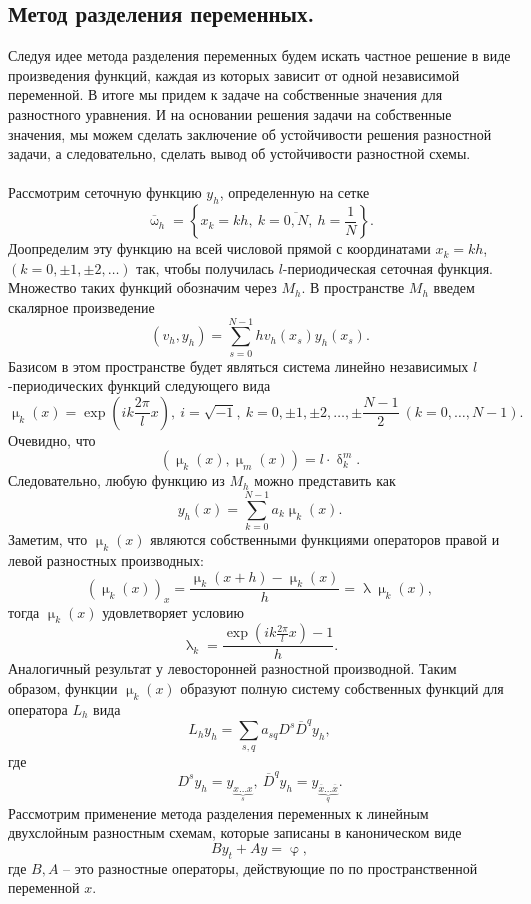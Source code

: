\documentclass[a4paper, 12pt]{report}
\numberwithin{equation}{section}
\newcommand{\ol}{\overline}
\renewcommand{\delta}{\updelta}
\renewcommand{\varphi}{\upvarphi}
\renewcommand{\lambda}{\uplambda}
\renewcommand{\mu}{\upmu}
\renewcommand{\omega}{\upomega}
\begin{document}
		 \subsection{Метод разделения переменных.}
		 Следуя идее метода разделения переменных будем искать частное решение в виде произведения функций, каждая из которых зависит от одной независимой переменной. В итоге мы придем к задаче на собственные значения для разностного уравнения. И на основании решения задачи на собственные значения, мы можем сделать заключение об устойчивости решения разностной задачи, а следовательно, сделать вывод об устойчивости разностной схемы.\\\\
		 Рассмотрим сеточную функцию $y_h$, определенную на сетке $$\ol \omega _h = \left\{x_k = kh,\ k = \ol{0,N},\ h = \dfrac 1N\right\}.$$
		 Доопределим эту функцию на всей числовой прямой с координатами $x_k = kh$, $(k = 0, \pm 1, \pm 2,\ldots)$ так, чтобы получилась $l$-периодическая сеточная функция. Множество таких функций обозначим через $M_h$. В пространстве $M_h$ введем скалярное произведение
		 $$(v_h, y_h) = \sum_{s=0}^{N-1} h v_h(x_s) y_h(x_s).$$
		 Базисом в этом пространстве будет являться система линейно независимых $l$-периодических функций следующего вида
		 $$\mu_k(x)=\exp\left(ik \frac {2\pi}lx\right),\ i = \sqrt{-1},\ k=0,\pm1,\pm2,\ldots,\pm \dfrac {N-1}{2}\ (k=0,\ldots,N-1).$$
		 Очевидно, что $$(\mu_k(x), \mu_m(x)) = l\cdot \delta ^m_k.$$
		 Следовательно, любую функцию из $M_h$ можно представить как
		 $$y_h(x) = \sum_{k=0}^{N-1} a_k \mu_k(x).$$
		 Заметим, что $\mu_k(x)$ являются собственными функциями операторов правой и левой разностных производных:
		 $$(\mu_k(x))_x = \dfrac{\mu_k(x+h) - \mu_k(x)}{h} = \lambda \mu_k(x),$$
		 тогда $\mu_k(x)$ удовлетворяет условию
		 $$\lambda_k = \dfrac{\exp\left(ik \frac {2\pi}lx\right) - 1}{h}.$$
		 Аналогичный результат у левосторонней разностной производной. Таким образом, функции $\mu_k(x)$ образуют полную систему собственных функций для оператора
		 $L_h$ вида $$L_h y_h = \sum_{s,q} a_{sq}D^s \ol D^q y_h,$$
		 где
		 $$D^s y_h = y_{\underbrace{x\ldots x}_s},\ \ol D^q y_h = y_{\underbrace{\ol x\ldots \ol x}_q}.$$
		 Рассмотрим применение метода разделения переменных к линейным двухслойным разностным схемам, которые записаны в каноническом виде
		 \begin{equation}
		 	By_t + A y = \varphi,
		 \end{equation}
		 где $B, A$ -- это разностные операторы, действующие по по пространственной переменной $x$.\\\\
\end{document}
